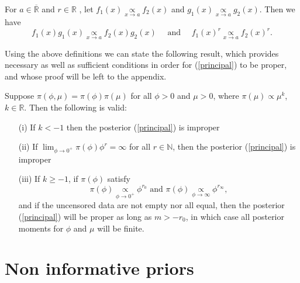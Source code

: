 \begin{proposition}\label{properties} For $a\in\overline{\mathbb{R}}$ and $r\in\mathbb{R}$ , let $f_1(x)\underset{x\to a}{\propto} f_2(x)$ and $g_1(x)\underset{x\to a}{\propto} g_2(x)$. Then we have
\begin{equation*}
f_1(x)g_1(x)\underset{x\to a}{\propto}f_2(x)g_2(x) \quad \mbox{ and } \quad f_1(x)^r\underset{x\to a}{\propto}f_2(x)^r.
\end{equation*}

\end{proposition} 

Using the above definitions we can state the following result, which provides necessary as well as sufficient conditions in order for (\ref{principal}) to be proper, and whose proof will be left to the appendix.

\begin{theorem}\label{mainth} Suppose $\pi(\phi,\mu) = \pi(\phi)\pi(\mu)$ for all $\phi>0$ and $\mu>0$, where $\pi(\mu)\propto \mu^k$, $k\in \mathbb{R}$. Then the following is valid:
\begin{itemize}
    \item[(i)] If $k< -1$ then the posterior (\ref{principal}) is improper
    \item[(ii)] If $\lim_{\phi\to 0^+}\pi(\phi)\phi^r = \infty$ for all $r\in \mathbb{N}$, then the posterior (\ref{principal}) is improper
    \item[(iii)] If $k\geq -1$, if $\pi(\phi)$ satisfy
    \begin{equation*} \pi(\phi)\underset{\phi\to 0^+}{\propto} \phi^{r_0}\mbox{ and }\pi(\phi)\underset{\phi\to \infty}{\propto} \phi^{r_\infty},
    \end{equation*}
    and if the uncensored data are not empty nor all equal, then the posterior (\ref{principal}) will be proper as long as $m>-r_0$, in which case all posterior moments for $\phi$ and $\mu$ will be finite.
\end{itemize}

\end{theorem}

\section{Non informative priors}\label{sec:3}



